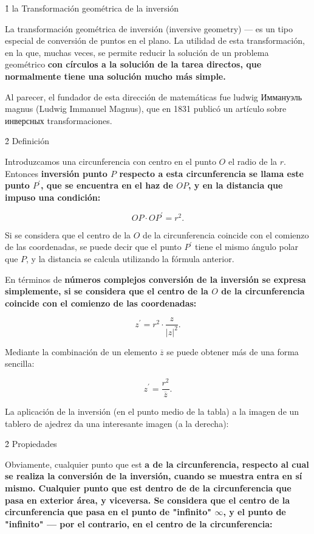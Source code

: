 \h1{ la Transformación geométrica de la inversión }

La transformación geométrica de inversión (inversive geometry) --- es un tipo especial de conversión de puntos en el plano. La utilidad de esta transformación, en la que, muchas veces, se permite reducir la solución de un problema geométrico \bf{con círculos} a la solución de la tarea \bf{directos}, que normalmente tiene una solución mucho más simple.

Al parecer, el fundador de esta dirección de matemáticas fue ludwig Иммануэль magnus (Ludwig Immanuel Magnus), que en 1831 publicó un artículo sobre инверсных transformaciones.


\h2{ Definición }

Introduzcamos una circunferencia con centro en el punto $O$ el radio de la $r$. Entonces \bf{inversión} punto $P$ respecto a esta circunferencia se llama este punto $P^\prime$, que se encuentra en el haz de $OP$, y en la distancia que impuso una condición:

$$ OP \cdot OP^\prime = r^2. $$


Si se considera que el centro de la $O$ de la circunferencia coincide con el comienzo de las coordenadas, se puede decir que el punto $P^\prime$ tiene el mismo ángulo polar que $P$, y la distancia se calcula utilizando la fórmula anterior.

En términos de \bf{números complejos} conversión de la inversión se expresa simplemente, si se considera que el centro de la $O$ de la circunferencia coincide con el comienzo de las coordenadas:

$$ z^\prime = r^2 \cdot \frac{ z }{ |z|^2 }. $$

Mediante la combinación de un elemento $\overline{z}$ se puede obtener más de una forma sencilla:

$$ z^\prime = \frac{ r^2 }{ \overline{z} }. $$

La aplicación de la inversión (en el punto medio de la tabla) a la imagen de un tablero de ajedrez da una interesante imagen (a la derecha):



\h2{ Propiedades }

Obviamente, cualquier punto que est \bf{a de la circunferencia}, respecto al cual se realiza la conversión de la inversión, cuando se muestra entra en sí mismo. Cualquier punto que est \bf{dentro de} de la circunferencia que pasa en \bf{exterior} área, y viceversa. Se considera que el centro de la circunferencia que pasa en el punto de "infinito" $\infty$, y el punto de "infinito" --- por el contrario, en el centro de la circunferencia:

